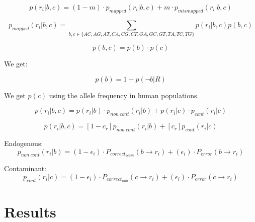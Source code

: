 \documentclass[a4paper,12pt]{article}
\begin{document}
\begin{equation}
p(r_i|b,c)  = (1-m) \cdot p_{mapped}(r_i|b,c) + m \cdot p_{mismapped}(r_i|b,c)  %
\end{equation}


\begin{equation}
p_{mapped}(r_i|b,c) = \sum\limits_{ b,c \in \{AC,AG,AT,CA,CG,CT,GA,GC,GT,TA,TC,TG\} } p(r_i|b,c) p(b,c)
\end{equation}

\begin{equation}
p(b,c) = p(b) \cdot p(c)
\end{equation}

\noindent We get:

\begin{equation}
p(b)  = 1 - p(\neg b|R)
\end{equation}

\noindent  We get $p(c)$ using the allele frequency in human populations.

\begin{equation}
p(r_i|b,c)  =  p(r_i|b) \cdot p_{non\ cont}(r_i|b)  +  p(r_i|c) \cdot p_{cont}(r_i|c) 
\end{equation}


\begin{equation}
p(r_i|b,c)  =  [1-c_r]  p_{non\ cont}(r_i|b) +  [c_r] p_{cont}(r_i|c) 
\end{equation}

\noindent Endogenous:
\begin{equation}
p_{non\ cont}(r_i|b) = (1-\epsilon_i ) \cdot  P_{correct_{deam}}( b \to r_i) +  (\epsilon_i) \cdot P_{error}(  b \to r_i )   
\end{equation}

\noindent Contaminant:
\begin{equation}
p_{cont}(r_i|c) = (1-\epsilon_i ) \cdot  P_{correct_{null}}( c \to r_i) +  (\epsilon_i) \cdot P_{error}(  c \to r_i )   
\end{equation}






\clearpage



\section{Results}
\end{document}

